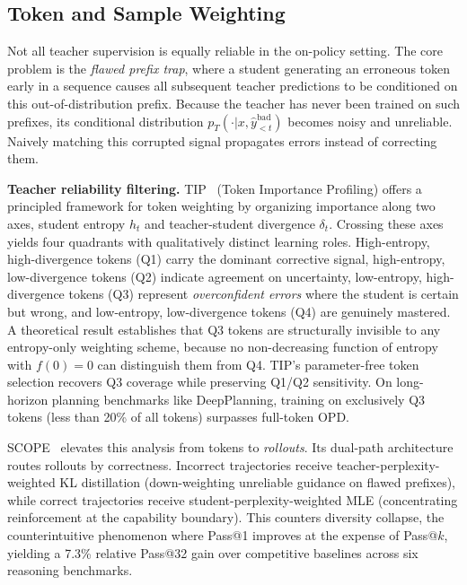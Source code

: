 \documentclass{article} %
\newcommand{\pteacher}{p_T}
\begin{document}
\subsection{Token and Sample Weighting}
\label{subsec:weighting}

Not all teacher supervision is equally reliable in the on-policy setting. The core problem is the \emph{flawed prefix trap}, where a student generating an erroneous token early in a sequence causes all subsequent teacher predictions to be conditioned on this out-of-distribution prefix. Because the teacher has never been trained on such prefixes, its conditional distribution $\pteacher(\cdot|x, \hat{y}_{<t}^{\text{bad}})$ becomes noisy and unreliable. Naively matching this corrupted signal propagates errors instead of correcting them.

\textbf{Teacher reliability filtering.} TIP~\citep{2604.14084} (Token Importance Profiling) offers a principled framework for token weighting by organizing importance along two axes, student entropy $h_t$ and teacher-student divergence $\delta_t$. Crossing these axes yields four quadrants with qualitatively distinct learning roles. High-entropy, high-divergence tokens (Q1) carry the dominant corrective signal, high-entropy, low-divergence tokens (Q2) indicate agreement on uncertainty, low-entropy, high-divergence tokens (Q3) represent \emph{overconfident errors} where the student is certain but wrong, and low-entropy, low-divergence tokens (Q4) are genuinely mastered. A theoretical result establishes that Q3 tokens are structurally invisible to any entropy-only weighting scheme, because no non-decreasing function of entropy with $f(0)=0$ can distinguish them from Q4. TIP's parameter-free token selection recovers Q3 coverage while preserving Q1/Q2 sensitivity. On long-horizon planning benchmarks like DeepPlanning, training on exclusively Q3 tokens (less than 20\% of all tokens) surpasses full-token OPD.

SCOPE~\citep{2604.10688} elevates this analysis from tokens to \emph{rollouts}. Its dual-path architecture routes rollouts by correctness. Incorrect trajectories receive teacher-perplexity-weighted KL distillation (down-weighting unreliable guidance on flawed prefixes), while correct trajectories receive student-perplexity-weighted MLE (concentrating reinforcement at the capability boundary). This counters diversity collapse, the counterintuitive phenomenon where Pass@1 improves at the expense of Pass@$k$, yielding a 7.3\% relative Pass@32 gain over competitive baselines across six reasoning benchmarks.
\end{document}
